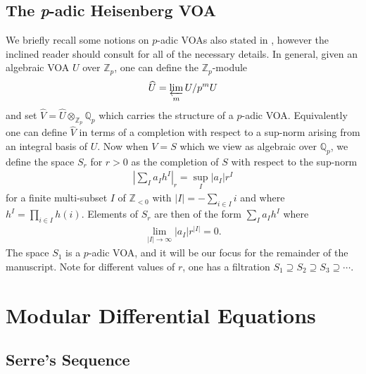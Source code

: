 \documentclass[10pt,a4paper]{amsart}
\numberwithin{equation}{section}
\theoremstyle{definition}
\newcommand{\Heis}{S}
\begin{document}
\subsection{The \textit{p}-adic Heisenberg VOA}

We briefly recall some notions on $p$-adic VOAs also stated in \cite{BF24}, however the inclined reader should consult \cite{FM23} for all of the necessary details. In general, given an algebraic VOA $U$ over $\mathbb{Z}_{p}$, one can define the $\mathbb{Z}_{p}$-module
\begin{align*}
    \widehat{U} = \varprojlim_{m} U / p^{m} U
\end{align*}
and set $\widehat{V} = \widehat{U} \otimes_{\mathbb{Z}_{p}} \mathbb{Q}_{p}$ which carries the structure of a $p$-adic VOA. Equivalently one can define $\widehat{V}$ in terms of a completion with respect to a sup-norm arising from an integral basis of $U$. Now when $V = \Heis$ which we view as algebraic over $\mathbb{Q}_{p}$, we define the space $S_{r}$ for $r > 0$ as the completion of $\Heis$ with respect to the sup-norm
\begin{align*}
    \left\lvert \sum_{I} a_{I}h^{I} \right\rvert_{r} = \sup_{I} \vert a_{I} \vert r^{I}
\end{align*}
for a finite multi-subset $I$ of $\mathbb{Z}_{<0}$ with $\vert I \vert = - \sum_{i \in I} i$ and where $h^{I} = \prod_{i \in I} h(i)$. Elements of $S_{r}$ are then of the form $\sum_{I} a_{I}h^{I}$ where
\begin{align*}
    \lim_{\vert I \vert \to \infty} \vert a_{I} \vert r^{\vert I \vert} = 0.
\end{align*}
The space $S_{1}$ is a $p$-adic VOA, and it will be our focus for the remainder of the manuscript. Note for different values of $r$, one has a filtration $S_{1} \supseteq S_{2} \supseteq S_{3} \supseteq \cdots $.


\section{Modular Differential Equations} \label{Section: MLDES}

\subsection{Serre's Sequence} \label{Subsection: Serre's Sequence}
\end{document}
